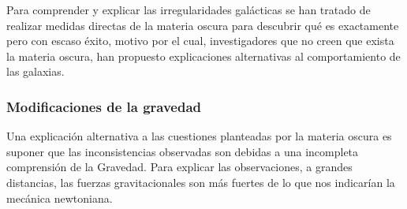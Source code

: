 
Para comprender y explicar las irregularidades galácticas se han tratado de realizar medidas directas de la materia oscura para descubrir qué es exactamente pero con escaso éxito, motivo por el cual, investigadores que no creen que exista la materia oscura, han propuesto explicaciones alternativas al comportamiento de las galaxias.

\subsubsection{Modificaciones de la gravedad}

Una explicación alternativa a las cuestiones planteadas por la materia oscura es suponer que las inconsistencias observadas son debidas a una incompleta comprensión de la Gravedad. Para explicar las observaciones, a grandes distancias, las fuerzas gravitacionales son más fuertes de lo que nos indicarían la mecánica newtoniana. 
